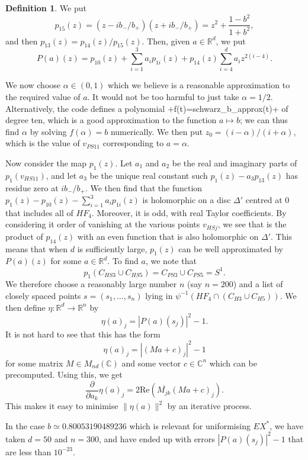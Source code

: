 \documentclass[reqno]{amsart}
\newcommand{\Dl}        {\Delta}
\newcommand{\al}        {\alpha}
\newcommand{\R}         {{\mathbb{R}}}
\newcommand{\C}         {{\mathbb{C}}}
\newcommand{\ov}[1]     {\overline{#1}}
\renewcommand{\:}{\colon}
\theoremstyle{definition}
\newtheorem{definition}[theorem]{Definition}
\begin{document}
\begin{definition}
 We put
 \[ p_{15}(z) =
     (z-ib_-/b_+)(z+ib_-/b_+) = z^2 + \frac{1-b^2}{1+b^2},
 \]
 and then $p_{13}(z)=p_{14}(z)/p_{15}(z)$.  Then, given $a\in\R^d$, we
 put
 \[ P(a)(z) = p_{10}(z) + \sum_{i=1}^3 a_ip_{1i}(z) +
     p_{14}(z)\sum_{i=4}^da_iz^{2(i-4)}.
 \]
\end{definition}

We now choose $\al\in(0,1)$ which we believe is a reasonable
approximation to the required value of $a$.  It would not be too
harmful to just take $\al=1/2$.  Alternatively, the code defines a
polynomial \mcode+f(t)=schwarz_b_approx(t)+ of degree ten, which is a
good approximation to the function $a\mapsto b$; we can thus find
$\al$ by solving $f(\al)=b$ numerically.  We then put
$z_0=(i-\al)/(i+\al)$, which is the value of $v_{PS11}$ corresponding
to $a=\al$.

Now consider the map $p_1(z)$.  Let $a_1$ and $a_2$ be the real and
imaginary parts of $p_1(v_{HS11})$, and let $a_3$ be the unique
real constant such $p_1(z)-a_3p_{13}(z)$ has residue zero at
$ib_-/b_+$.  We then find that the function
$p_1(z)-p_{10}(z)-\sum_{i=1}^3a_ip_{1i}(z)$ is holomorphic on a disc
$\Dl'$ centred at $0$ that includes all of $HF_4$.  Moreover, it is
odd, with real Taylor coefficients.  By considering it order of
vanishing at the various points $v_{HSj}$, we see that is the product
of $p_{14}(z)$ with an even function that is also holomorphic on $\Dl'$.
This means that when $d$ is sufficiently large, $p_1(z)$ can be well
approximated by $P(a)(z)$ for some $a\in\R^d$.  To find $a$, we note
that
\[ p_1(C_{HS3}\cup C_{HS5})=C_{PS3}\cup C_{PS5} = S^1. \]
We therefore choose a reasonably large number $n$ (say $n=200$) and a
list of closely spaced points $s=(s_1,\dotsc,s_n)$ lying in
$\psi^{-1}(HF_4\cap(C_{H3}\cup C_{H5}))$.  We then define
$\eta\:\R^d\to\R^n$ by
\[ \eta(a)_j = |P(a)(s_j)|^2 - 1. \]
It is not hard to see that this has the form
\[ \eta(a)_j = |(Ma+c)_j|^2 - 1 \]
for some matrix $M\in M_{nd}(\C)$ and some vector $c\in\C^n$ which can
be precomputed.  Using this, we get
\[ \frac{\partial}{\partial a_k}\eta(a)_j =
    2\text{Re}(\ov{M_{jk}}(Ma+c)_j).
\]
This makes it easy to minimise $\|\eta(a)\|^2$ by an iterative process.

In the case $b\simeq 0.80053190489236$ which is relevant for
uniformising $EX^*$, we have taken $d=50$ and $n=300$, and have ended
up with errors $|P(a)(s_j)|^2-1$ that are less than $10^{-23}$.
\end{document}
